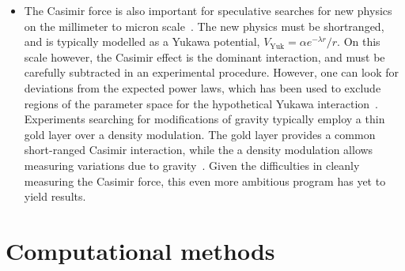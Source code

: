 \begin{itemize}
\item The Casimir force is also important for speculative searches for new physics on the millimeter to micron
scale~\cite{Dimopoulos2003, Bezerra2011}.  The new physics must be shortranged, and is typically modelled as 
a Yukawa potential, $V_{\text{Yuk}}=\alpha e^{-\lambda r}/r$.  
On this scale however, the Casimir effect is the dominant interaction, and must be 
carefully subtracted in an experimental procedure.  However, one can look for deviations from the expected 
power laws, which has been used to exclude regions of the parameter space for the hypothetical
Yukawa interaction~\cite{Lamoreaux1997,Obrecht2007,Bezerra2011}.  
Experiments searching for modifications of gravity typically employ a thin gold layer over
a density modulation.  The gold layer provides a common short-ranged Casimir interaction, while the 
a density modulation allows measuring variations due to gravity~\cite{Sorrentino2009, Geraci2015}.
Given the difficulties in cleanly measuring the Casimir force, this even more ambitious program has yet 
to yield results.  
\end{itemize}




\section{Computational methods}

